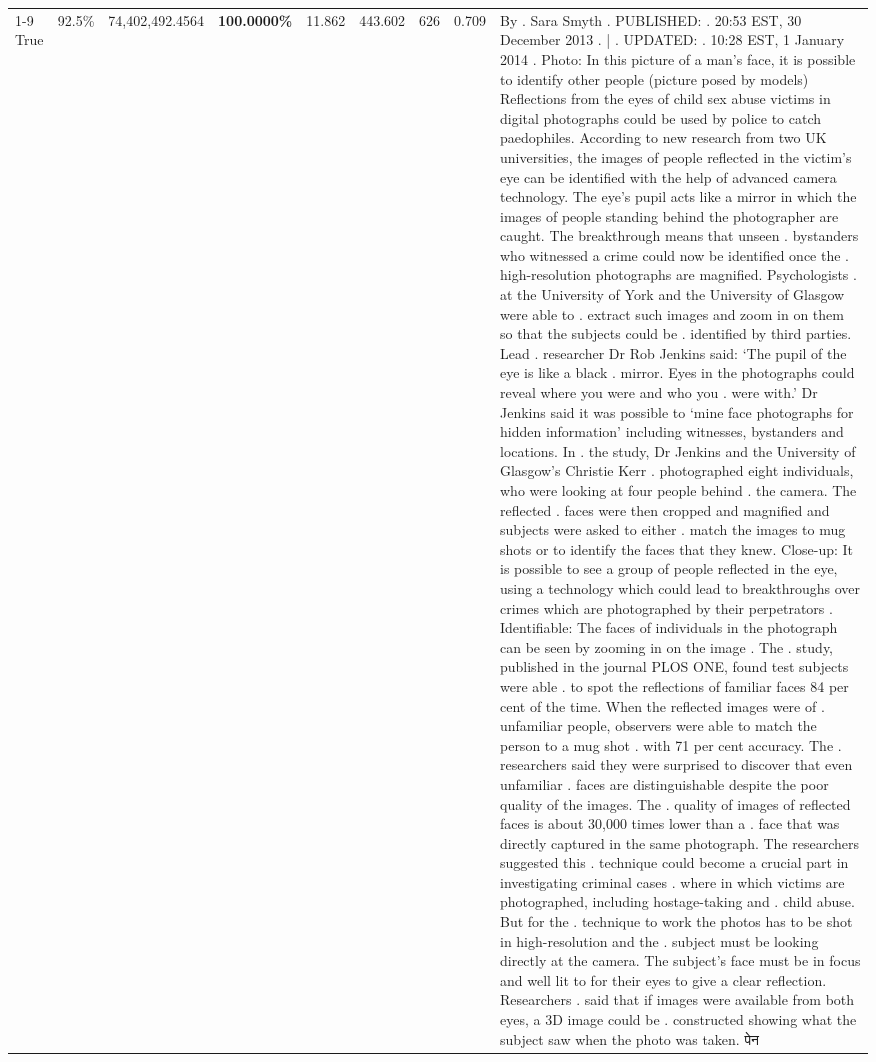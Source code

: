 \begin{table}[H]
\begin{tabular}{lllrlllll}
\cline{1-9}
True & 92.5\% & 74,402,492.4564 & \bfseries \color{red} 100.0000\% & 11.862 & 443.602 & 626 & 0.709 & By . Sara Smyth . PUBLISHED: . 20:53 EST, 30 December 2013 . | . UPDATED: . 10:28 EST, 1 January 2014 . Photo: In this picture of a man's face, it is possible to identify other people (picture posed by models) Reflections from the eyes of child sex abuse victims in digital photographs could be used by police to catch paedophiles. According to new research from two UK universities, the images of people reflected in the victim's eye can be identified with the help of advanced camera technology. The eye's pupil acts like a mirror in which the images of people standing behind the photographer are caught. The breakthrough means that unseen . bystanders who witnessed a crime could now be identified once the . high-resolution photographs are magnified. Psychologists . at the University of York and the University of Glasgow were able to . extract such images and zoom in on them so that the subjects could be . identified by third parties. Lead . researcher Dr Rob Jenkins said: ‘The pupil of the eye is like a black . mirror. Eyes in the photographs could reveal where you were and who you . were with.' Dr Jenkins said it was possible to ‘mine face photographs for hidden information' including witnesses, bystanders and locations. In . the study, Dr Jenkins and the University of Glasgow's Christie Kerr . photographed eight individuals, who were looking at four people behind . the camera. The reflected . faces were then cropped and magnified and subjects were asked to either . match the images to mug shots or to identify the faces that they knew. Close-up: It is possible to see a group of people reflected in the eye, using a technology which could lead to breakthroughs over crimes which are photographed by their perpetrators . Identifiable: The faces of individuals in the photograph can be seen by zooming in on the image . The . study, published in the journal PLOS ONE, found test subjects were able . to spot the reflections of familiar faces 84 per cent of the time. When the reflected images were of . unfamiliar people, observers were able to match the person to a mug shot . with 71 per cent accuracy. The . researchers said they were surprised to discover that even unfamiliar . faces are distinguishable despite the poor quality of the images. The . quality of images of reflected faces is about 30,000 times lower than a . face that was directly captured in the same photograph. The researchers suggested this . technique could become a crucial part in investigating criminal cases . where in which victims are photographed, including hostage-taking and . child abuse. But for the . technique to work the photos has to be shot in high-resolution and the . subject must be looking directly at the camera. The subject's face must be in focus and well lit to for their eyes to give a clear reflection. Researchers . said that if images were available from both eyes, a 3D image could be . constructed showing what the subject saw when the photo was taken. पेन \\

\end{tabular}
\end{table}

